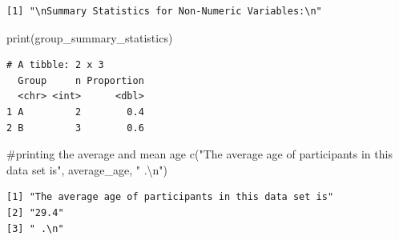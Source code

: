 \documentclass[
  letterpaper,
  DIV=11,
  numbers=noendperiod]{scrartcl}
\newenvironment{Shaded}{\begin{snugshade}}{\end{snugshade}}
\newcommand{\CommentTok}[1]{\textcolor[rgb]{0.37,0.37,0.37}{#1}}
\newcommand{\DecValTok}[1]{\textcolor[rgb]{0.68,0.00,0.00}{#1}}
\newcommand{\FunctionTok}[1]{\textcolor[rgb]{0.28,0.35,0.67}{#1}}
\newcommand{\NormalTok}[1]{\textcolor[rgb]{0.00,0.23,0.31}{#1}}
\newcommand{\SpecialCharTok}[1]{\textcolor[rgb]{0.37,0.37,0.37}{#1}}
\newcommand{\StringTok}[1]{\textcolor[rgb]{0.13,0.47,0.30}{#1}}
\begin{document}
\begin{verbatim}
[1] "\nSummary Statistics for Non-Numeric Variables:\n"
\end{verbatim}

\begin{Shaded}
\begin{Highlighting}[]
\FunctionTok{print}\NormalTok{(group\_summary\_statistics)}
\end{Highlighting}
\end{Shaded}

\begin{verbatim}
# A tibble: 2 x 3
  Group     n Proportion
  <chr> <int>      <dbl>
1 A         2        0.4
2 B         3        0.6
\end{verbatim}

\begin{Shaded}
\begin{Highlighting}[]
\CommentTok{\#printing the average and mean age}
\FunctionTok{c}\NormalTok{(}\StringTok{"The average age of participants in this data set is"}\NormalTok{, average\_age, }\StringTok{" .}\SpecialCharTok{\textbackslash{}n}\StringTok{"}\NormalTok{)}
\end{Highlighting}
\end{Shaded}

\begin{verbatim}
[1] "The average age of participants in this data set is"
[2] "29.4"                                               
[3] " .\n"                                               
\end{verbatim}

\begin{Shaded}
\end{Shaded}
\end{document}

